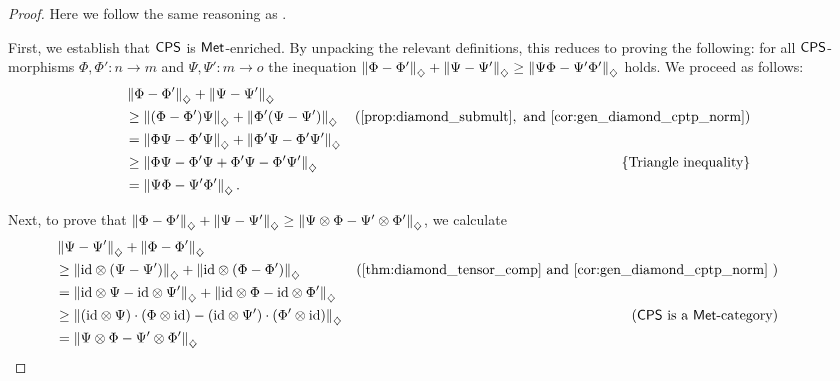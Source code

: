 \begin{proof}
  Here we follow the same reasoning as \cite[Proof of  Proposition 4.1, Section 4.3]{dahlqvist2023syntactic}.

  First, we establish that $\mathsf{CPS}$ is $\mathsf{Met}$-enriched. By unpacking the relevant definitions, this reduces to proving the following: for all $\mathsf{CPS}$-morphisms $\Phi, \Phi' : n \to m$ and $\Psi, \Psi' : m \to o$ the inequation $\left\lVert \Phi-\Phi' \right\rVert_{\diamondsuit} + \left\lVert \Psi-\Psi' \right\rVert_{\diamondsuit} \geq \left\lVert \Psi\Phi-\Psi'\Phi' \right\rVert_{\diamondsuit} $ holds. 
  We proceed as follows:
\begin{align*}
  & \diamondnorm{\Phi - \Phi'} + \diamondnorm{\Psi - \Psi'} \\
&\geq \diamondnorm{(\Phi - \Phi')\Psi} +  \diamondnorm{\Phi'(\Psi - \Psi')}  & (\text{\autoref{prop:diamond_submult}}, \text{ and \autoref{cor:gen_diamond_cptp_norm}}) \\
& = \diamondnorm{\Phi \Psi- \Phi' \Psi} +  \diamondnorm{\Phi'\Psi - \Phi' \Psi'} \\
& \geq  \diamondnorm{\Phi \Psi- \Phi' \Psi + \Phi'\Psi - \Phi' \Psi' }  & \{ \text{Triangle inequality} \} \\
&= \diamondnorm{\Psi\Phi-\Psi'\Phi'}.
\end{align*}

  Next, to prove that  $\left\lVert \Phi-\Phi' \right\rVert_{\diamondsuit} + \left\lVert \Psi-\Psi' \right\rVert_{\diamondsuit} \geq \left\lVert \Psi \otimes \Phi-\Psi' \otimes \Phi' \right\rVert_{\diamondsuit} $, we calculate
  \begin{align*}
      & \hspace{-30pt} \diamondnorm{\Psi - \Psi'} + \diamondnorm{\Phi - \Phi'} \\
      & \hspace{-30pt} \geq \diamondnorm{\id \otimes \left(\Psi-\Psi'\right)} + \diamondnorm{\id \otimes \left(\Phi-\Phi'\right)} & (\text{\autoref{thm:diamond_tensor_comp} and \autoref{cor:gen_diamond_cptp_norm} })  \\
      &\hspace{-30pt} =  \diamondnorm{\id \otimes \Psi- \id \otimes\Psi'} + \diamondnorm{\id \otimes \Phi- \id \otimes\Phi'} \\
      &\hspace{-30pt} \geq \diamondnorm{\left( \id \otimes \Psi \right) \cdot \left( \Phi \otimes \id \right) -  \left( \id \otimes \Psi' \right) \cdot \left( \Phi' \otimes \id \right)} & (\catCPS \text{ is a } \mathsf{Met}\text{-category}) \\
      &\hspace{-30pt} = \diamondnorm{\Psi \otimes \Phi - \Psi' \otimes \Phi'}
  \end{align*}

\end{proof}


